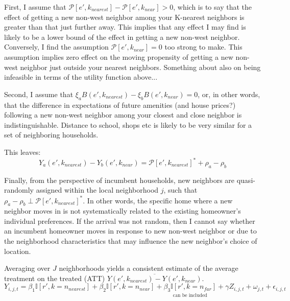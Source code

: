\documentclass[../main.tex]{subfiles}
\begin{document}

First, I assume that $\mathcal{P}[e', k_{nearest}] - \mathcal{P}[e', k_{near}] > 0$, which is to say that the effect of getting a new non-west neighbor among your K-nearest neighbors is greater than that just further away. This implies that any effect I may find is likely to be a lower bound of the effect in getting a new non-west neighbor. Conversely, I find the assumption $\mathcal{P}[e', k_{near}] = 0$ too strong to make. This assumption implies zero effect on the moving propensity of getting a new non-west neighbor just outside your nearest neighbors. Something about also on being infeasible in terms of the utility function above...

Second, I assume that $\xi_a B(e', k_{nearest}) - \xi_b B(e', k_{near})=0$, or, in other words, that the difference in expectations of future amenities (and house prices?) following a new non-west neighbor among your closest and close neighbor is indistinguishable. Distance to school, shops etc is likely to be very similar for a set of neighboring households. 

This leaves:
\begin{equation}
    Y_a(e', k_{nearest}) - Y_b(e', k_{near}) = \mathcal{P}[e', k_{nearest}]^* + \rho_a - \rho_b
\end{equation}

Finally, from the perspective of incumbent households, new neighbors are quasi-randomly assigned within the local neighborhood $j$, such that $\rho_a - \rho_b \perp \mathcal{P}[e', k_{nearest}]^*$. In other words, the specific home where a new neighbor moves in is not systematically related to the existing homeowner's individual preferences. If the arrival was not random, then I cannot say whether an incumbent homeowner moves in response to new non-west neighbor or due to the neighborhood characteristics that may influence the new neighbor's choice of location. 

Averaging over $J$ neighborhoods yields a consistent estimate of the average treatment on the treated (ATT) $\overline{Y(e', k_{nearest}) - Y(e', k_{near})}$. 
\begin{equation}
    Y_{i, j, t} = \beta_1 \mathbb{I}[r', k=n_{nearest}] + \beta_2 \mathbb{I}[r', k = n_{near}] + \underset{\text{can be included}}{ \beta_3 \mathbb{I}[r', k = n_{far}] }  + \gamma Z_{i, j, t} + \omega_{j, t} + \epsilon_{i, j, t}
    \label{eq:main_eq_schelling_behavior}
\end{equation}
\end{document}
